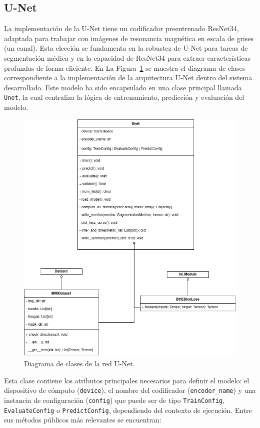 \documentclass[../main.tex]{subfiles}
\begin{document}
\subsection{U-Net}
La implementación de la U-Net tiene un codificador preentrenado ResNet34, adaptada para trabajar con imágenes de resonancia magnética en escala de grises (un canal). Esta elección se fundamenta en la robustez de U-Net para tareas de segmentación médica y en la capacidad de ResNet34 para extraer características profundas de forma eficiente. En La Figura~\ref{fig:unet-class-diag} se muestra el diagrama de clases correspondiente a la implementación de la arquitectura U-Net dentro del sistema desarrollado. Este modelo ha sido encapsulado en una clase principal llamada \texttt{Unet}, la cual centraliza la lógica de entrenamiento, predicción y evaluación del modelo.

\begin{figure}
    \centering
    \includegraphics[width=0.65\linewidth]{imgs/impl/unet-class-diag.drawio.png}
    \caption{Diagrama de clases de la red U-Net.}
    \label{fig:unet-class-diag}
\end{figure}

Esta clase contiene los atributos principales necesarios para definir el modelo: el dispositivo de cómputo (\texttt{device}), el nombre del codificador (\texttt{encoder\_name}) y una instancia de configuración (\texttt{config}) que puede ser de tipo \texttt{TrainConfig}, \texttt{EvaluateConfig} o \texttt{PredictConfig}, dependiendo del contexto de ejecución. Entre sus métodos públicos más relevantes se encuentran:
\end{document}
